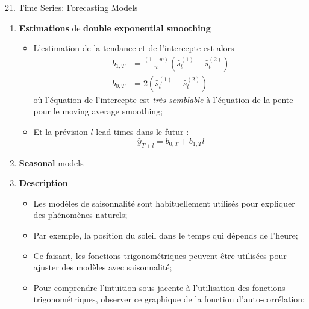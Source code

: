 \documentclass[12pt, titlepage, french]{report}
\begin{document}
\begin{CHPT_SUMM}[label = {timeseries21}]{21. Time Series: Forecasting Models}
\begin{enumerate}
\begin{enumerate}
		\item	Créer une \textbf{smoothed series} des valeurs $\hat{s}_{t}^{(1)}$ avec la formule simplifiée réécrite ci-dessous:
			\begin{equation*}
			\hat{s}_{t}^{(1)}	
				=	w \hat{s}^{(1)}_{t - 1} + (1 - w) y_{t}
			\end{equation*}
		\item	Pour	 créer une \textbf{doubly smoothed series}, utiliser l'étape précédente comme input:
			\begin{equation*}
			\hat{s}_{t}^{(2)}	
				=	w \hat{s}^{(2)}_{t - 1} + (1 - w) \hat{s}^{(1)}_{t}
			\end{equation*}
		\end{enumerate}
	\item[]	\textbf{Estimations} de \textbf{double exponential smoothing}
		\begin{itemize}
		\item	L'estimation de la tendance et de l'intercepte est alors
			\begin{align*}
			b_{1, T}	
				&=	\frac{(1 - w)}{w}\left(\hat{s}_{t}^{(1)} - \hat{s}_{t}^{(2)}\right)	\\
			b_{0, T}
				&=	2(\hat{s}_{t}^{(1)} - \hat{s}_{t}^{(2)})
			\end{align*}
			où l'équation de l'intercepte est \textit{très semblable} à l'équation de la pente pour le moving average smoothing;
		\item	Et la prévision $l$ lead times dans le futur :
			\begin{equation*}
			\hat{y}_{T + l}
				=	b_{0, T} + b_{1, T} l	
			\end{equation*}
		\end{itemize}
	\item	\textbf{Seasonal} models
	\item[]	\textbf{Description}
		\begin{itemize}
		\item	Les modèles de saisonnalité sont habituellement utilisés pour expliquer des phénomènes naturels;
		\item	Par exemple, la position du soleil dans le temps qui dépends de l'heure;
		\item	Ce faisant, les fonctions trigonométriques peuvent être utilisées pour ajuster des modèles avec saisonnalité;
		\item[]	Pour comprendre l'intuition sous-jacente à l'utilisation des fonctions trigonométriques, observer ce graphique de la fonction d'auto-corrélation:
		

\end{itemize}
\end{enumerate}
\end{CHPT_SUMM}
\end{document}
